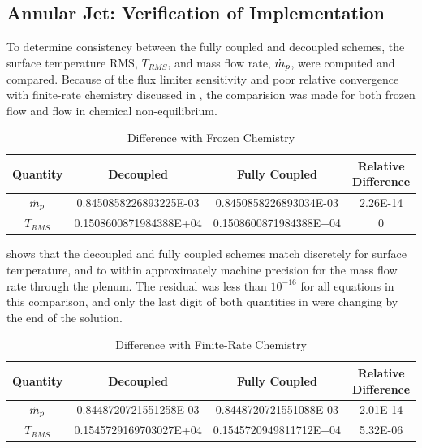 \subsection{Annular Jet: Verification of Implementation}
\label{sec:annular-jet-flow-verify}

To determine consistency between the fully coupled and decoupled schemes, the
surface temperature RMS, $T_{RMS}$, and mass flow rate, $\dot{m}_p$, were
computed and compared.  Because of the flux limiter sensitivity and poor
relative convergence with finite-rate chemistry discussed in
, the comparision was made for both frozen flow and
flow in chemical non-equilibrium.
\begin{table}
  \centering
  \begin{tabular}{c|c|c|c}
    Quantity & Decoupled & Fully Coupled & Relative Difference \\
    \hline
    $\dot{m}_p$ & 0.8450858226893225E-03 & 0.8450858226893034E-03 & 2.26E-14 \\
    $T_{RMS}$   & 0.1508600871984388E+04 & 0.1508600871984388E+04 & 0
  \end{tabular}
  \caption{Difference with Frozen Chemistry}
  \label{tab:srp-frozen-flow-diff}
\end{table}
 shows that the decoupled and fully coupled
schemes match discretely for surface temperature, and to within approximately
machine precision for the mass flow rate through the plenum.  The residual was
less than $10^{-16}$ for all equations in this comparison, and only the last
digit of both quantities in  were changing by the
end of the solution.
\begin{table}
  \centering
  \begin{tabular}{c|c|c|c}
    Quantity & Decoupled & Fully Coupled & Relative Difference \\
    \hline
    $\dot{m}_p$ & 0.8448720721551258E-03 & 0.8448720721551088E-03 & 2.01E-14 \\
    $T_{RMS}$   & 0.1545729169703027E+04 & 0.1545720949811712E+04 & 5.32E-06
  \end{tabular}
  \caption{Difference with Finite-Rate Chemistry}
  \label{tab:srp-chem-flow-diff}
\end{table}
